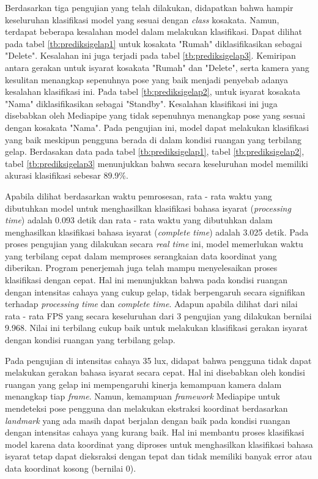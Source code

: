 Berdasarkan tiga pengujian yang telah dilakukan, didapatkan bahwa hampir keseluruhan klasifikasi model yang sesuai dengan \emph{class} kosakata. Namun, terdapat beberapa kesalahan model dalam melakukan klasifikasi. Dapat dilihat pada tabel \ref{tb:prediksigelap1} untuk kosakata "Rumah" diklasifikasikan sebagai "Delete". Kesalahan ini juga terjadi pada tabel \ref{tb:prediksigelap3}. Kemiripan antara gerakan untuk isyarat kosakata "Rumah" dan "Delete", serta kamera yang kesulitan menangkap sepenuhnya pose yang baik menjadi penyebab adanya kesalahan klasifikasi ini. Pada tabel \ref{tb:prediksigelap2}, untuk isyarat kosakata "Nama" diklasifikasikan sebagai "Standby". Kesalahan klasifikasi ini juga disebabkan oleh Mediapipe yang tidak sepenuhnya menangkap pose yang sesuai dengan kosakata "Nama". Pada pengujian ini,  model dapat melakukan klasifikasi yang baik meskipun pengguna berada di dalam kondisi ruangan yang terbilang gelap. Berdasakan data pada tabel \ref{tb:prediksigelap1}, tabel \ref{tb:prediksigelap2}, tabel \ref{tb:prediksigelap3} menunjukkan bahwa secara keseluruhan model memiliki akurasi klasifikasi sebesar 89.9\%. 

Apabila dilihat berdasarkan waktu pemrosesan, rata - rata waktu yang dibutuhkan model untuk menghasilkan klasifikasi bahasa isyarat (\emph{processing time}) adalah 0.093 detik dan rata - rata waktu yang dibutuhkan dalam menghasilkan klasifikasi bahasa isyarat (\emph{complete time}) adalah 3.025 detik. Pada proses pengujian yang dilakukan secara \emph{real time} ini, model memerlukan waktu yang terbilang cepat dalam memproses serangkaian data koordinat yang diberikan. Program penerjemah juga telah mampu menyelesaikan proses klasifikasi dengan cepat. Hal ini menunjukkan bahwa pada kondisi ruangan dengan intensitas cahaya yang cukup gelap, tidak berpengaruh secara signifikan terhadap \emph{processing time} dan \emph{complete time}. Adapun apabila dilihat dari nilai rata - rata FPS yang secara keseluruhan dari 3 pengujian yang dilakukan bernilai 9.968. Nilai ini terbilang cukup baik untuk melakukan klasifikasi gerakan isyarat dengan kondisi ruangan yang terbilang gelap.

Pada pengujian di intensitas cahaya 35 lux, didapat bahwa pengguna tidak dapat melakukan gerakan bahasa isyarat secara cepat. Hal ini disebabkan oleh kondisi ruangan yang gelap ini mempengaruhi kinerja kemampuan kamera dalam menangkap tiap \emph{frame}. Namun, kemampuan \emph{framework} Mediapipe untuk mendeteksi pose pengguna dan melakukan ekstraksi koordinat berdasarkan \emph{landmark} yang ada masih dapat berjalan dengan baik pada kondisi ruangan dengan intensitas cahaya yang kurang baik. Hal ini membantu proses klasifikasi model karena data koordinat yang diproses untuk menghasilkan klasifikasi bahasa isyarat tetap dapat dieksraksi dengan tepat dan tidak memiliki banyak error atau data koordinat kosong (bernilai 0). 

